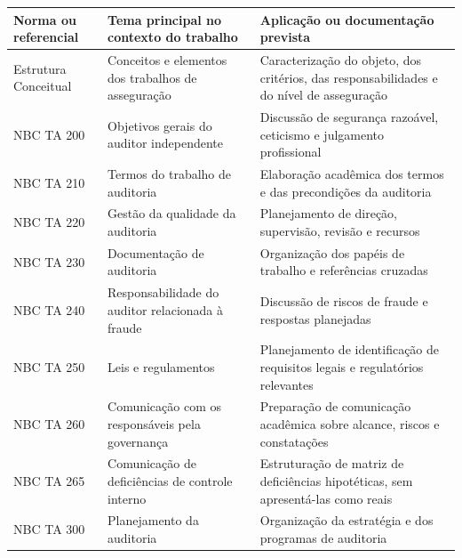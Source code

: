 \documentclass[
]{article}
\newcounter{none} %
\begin{document}
{\def\LTcaptype{none} %
\begin{longtable}[]{@{}
  >{\raggedright\arraybackslash}p{}
  >{\raggedright\arraybackslash}p{}
  >{\raggedright\arraybackslash}p{}@{}}
\toprule\noalign{}
\begin{minipage}[b]{\linewidth}\raggedright
Norma ou referencial
\end{minipage} & \begin{minipage}[b]{\linewidth}\raggedright
Tema principal no contexto do trabalho
\end{minipage} & \begin{minipage}[b]{\linewidth}\raggedright
Aplicação ou documentação prevista
\end{minipage} \\
\midrule\noalign{}
\endhead
\bottomrule\noalign{}
\endlastfoot
Estrutura Conceitual & Conceitos e elementos dos trabalhos de
asseguração & Caracterização do objeto, dos critérios, das
responsabilidades e do nível de asseguração \\
NBC TA 200 & Objetivos gerais do auditor independente & Discussão de
segurança razoável, ceticismo e julgamento profissional \\
NBC TA 210 & Termos do trabalho de auditoria & Elaboração acadêmica dos
termos e das precondições da auditoria \\
NBC TA 220 & Gestão da qualidade da auditoria & Planejamento de direção,
supervisão, revisão e recursos \\
NBC TA 230 & Documentação de auditoria & Organização dos papéis de
trabalho e referências cruzadas \\
NBC TA 240 & Responsabilidade do auditor relacionada à fraude &
Discussão de riscos de fraude e respostas planejadas \\
NBC TA 250 & Leis e regulamentos & Planejamento de identificação de
requisitos legais e regulatórios relevantes \\
NBC TA 260 & Comunicação com os responsáveis pela governança &
Preparação de comunicação acadêmica sobre alcance, riscos e
constatações \\
NBC TA 265 & Comunicação de deficiências de controle interno &
Estruturação de matriz de deficiências hipotéticas, sem apresentá-las
como reais \\
NBC TA 300 & Planejamento da auditoria & Organização da estratégia e dos
programas de auditoria \\

\end{longtable}}
\end{document}
